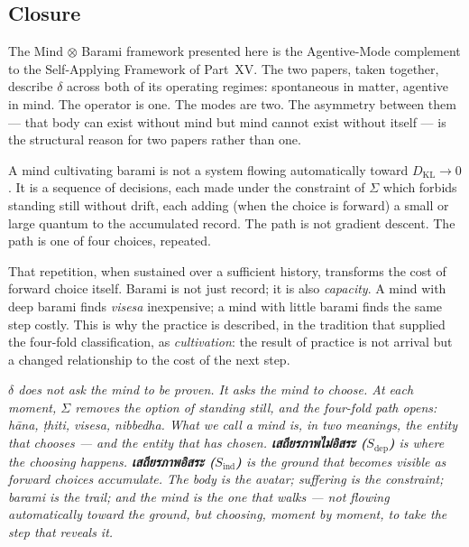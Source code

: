 \documentclass[12pt, a4paper]{article}
\begin{document}
\subsection{Closure}

The Mind $\otimes$ Barami framework presented here is the
Agentive-Mode complement to the Self-Applying Framework of Part~XV.
The two papers, taken together, describe $\delta$ across both of
its operating regimes: spontaneous in matter, agentive in mind. The
operator is one. The modes are two. The asymmetry between them ---
that body can exist without mind but mind cannot exist without
itself --- is the structural reason for two papers rather than one.

A mind cultivating barami is not a system flowing automatically
toward $D_{\mathrm{KL}} \to 0$. It is a sequence of decisions, each
made under the constraint of $\Sigma$ which forbids standing still
without drift, each adding (when the choice is forward) a small or
large quantum to the accumulated record. The path is not gradient
descent. The path is one of four choices, repeated.

That repetition, when sustained over a sufficient history, transforms
the cost of forward choice itself. Barami is not just record; it is
also \emph{capacity}. A mind with deep barami finds \emph{visesa}
inexpensive; a mind with little barami finds the same step costly.
This is why the practice is described, in the tradition that supplied
the four-fold classification, as \emph{cultivation}: the result of
practice is not arrival but a changed relationship to the cost of the
next step.

\begin{keybox}[title={Closing Sentence}]
\textit{$\delta$ does not ask the mind to be proven. It asks the mind
to choose. At each moment, $\Sigma$ removes the option of standing
still, and the four-fold path opens: hāna, ṭhiti, visesa, nibbedha.
What we call a mind is, in two meanings, the entity that chooses ---
and the entity that has chosen. \textbf{เสถียรภาพไม่อิสระ
($S_{\mathrm{dep}}$)} is where the choosing happens.
\textbf{เสถียรภาพอิสระ ($S_{\mathrm{ind}}$)} is the ground that
becomes visible as forward choices accumulate. The body is the
avatar; suffering is the constraint; barami is the trail; and the
mind is the one that walks --- not flowing automatically toward the
ground, but choosing, moment by moment, to take the step that
reveals it.}
\end{keybox}
\end{document}
